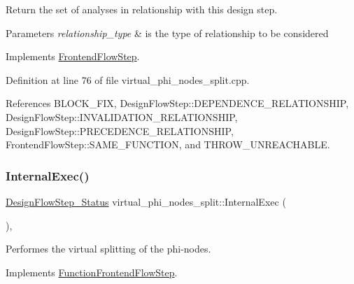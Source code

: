 Return the set of analyses in relationship with this design step. 


\begin{DoxyParams}{Parameters}
{\em relationship\+\_\+type} & is the type of relationship to be considered \\
\hline
\end{DoxyParams}


Implements \hyperlink{classFrontendFlowStep_abeaff70b59734e462d347ed343dd700d}{Frontend\+Flow\+Step}.



Definition at line 76 of file virtual\+\_\+phi\+\_\+nodes\+\_\+split.\+cpp.



References B\+L\+O\+C\+K\+\_\+\+F\+IX, Design\+Flow\+Step\+::\+D\+E\+P\+E\+N\+D\+E\+N\+C\+E\+\_\+\+R\+E\+L\+A\+T\+I\+O\+N\+S\+H\+IP, Design\+Flow\+Step\+::\+I\+N\+V\+A\+L\+I\+D\+A\+T\+I\+O\+N\+\_\+\+R\+E\+L\+A\+T\+I\+O\+N\+S\+H\+IP, Design\+Flow\+Step\+::\+P\+R\+E\+C\+E\+D\+E\+N\+C\+E\+\_\+\+R\+E\+L\+A\+T\+I\+O\+N\+S\+H\+IP, Frontend\+Flow\+Step\+::\+S\+A\+M\+E\+\_\+\+F\+U\+N\+C\+T\+I\+ON, and T\+H\+R\+O\+W\+\_\+\+U\+N\+R\+E\+A\+C\+H\+A\+B\+LE.

\mbox{\label{classvirtual__phi__nodes__split_a501e5736bc6234a5d835605af57e1fd5}} 
\subsubsection{\texorpdfstring{Internal\+Exec()}{InternalExec()}}
{\footnotesize\ttfamily \hyperlink{design__flow__step_8hpp_afb1f0d73069c26076b8d31dbc8ebecdf}{Design\+Flow\+Step\+\_\+\+Status} virtual\+\_\+phi\+\_\+nodes\+\_\+split\+::\+Internal\+Exec (\begin{DoxyParamCaption}{ }\end{DoxyParamCaption})\hspace{0.3cm}{\ttfamily [override]}, {\ttfamily [virtual]}}



Performes the virtual splitting of the phi-\/nodes. 



Implements \hyperlink{classFunctionFrontendFlowStep_a00612f7fb9eabbbc8ee7e39d34e5ac68}{Function\+Frontend\+Flow\+Step}.



